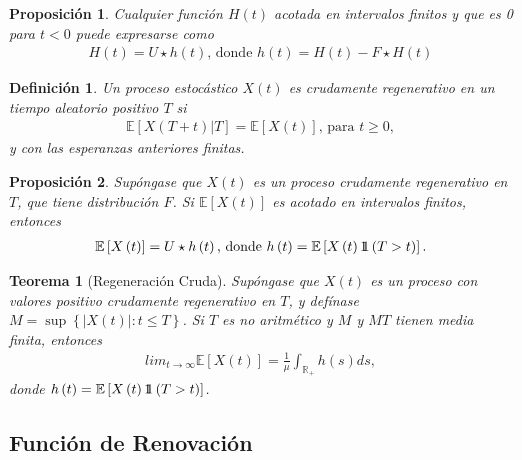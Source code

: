 \documentclass{article}
\newtheorem{Def}{Definición}
\newtheorem{Teo}{Teorema}
\newtheorem{Prop}{Proposición}
\newcommand{\rea}{\mathbb{R}}
\newcommand{\esp}{\mathbb{E}}
\newcommand{\indora}{\mbox{$1$\hspace{-0.8ex}$1$}}
\begin{document}
\begin{Prop}
Cualquier funci\'on $H\left(t\right)$ acotada en intervalos finitos y que es 0 para $t<0$ puede expresarse como
\begin{eqnarray*}
H\left(t\right)=U\star h\left(t\right)\textrm{,  donde }h\left(t\right)=H\left(t\right)-F\star H\left(t\right)
\end{eqnarray*}
\end{Prop}

\begin{Def}
Un proceso estoc\'astico $X\left(t\right)$ es crudamente regenerativo en un tiempo aleatorio positivo $T$ si
\begin{eqnarray*}
\esp\left[X\left(T+t\right)|T\right]=\esp\left[X\left(t\right)\right]\textrm{, para }t\geq0,\end{eqnarray*}
y con las esperanzas anteriores finitas.
\end{Def}

\begin{Prop}
Sup\'ongase que $X\left(t\right)$ es un proceso crudamente regenerativo en $T$, que tiene distribuci\'on $F$. Si $\esp\left[X\left(t\right)\right]$ es acotado en intervalos finitos, entonces
\begin{eqnarray*}
\esp\left[X\left(t\right)\right]=U\star h\left(t\right)\textrm{,  donde }h\left(t\right)=\esp\left[X\left(t\right)\indora\left(T>t\right)\right].
\end{eqnarray*}
\end{Prop}

\begin{Teo}[Regeneraci\'on Cruda]
Sup\'ongase que $X\left(t\right)$ es un proceso con valores positivo crudamente regenerativo en $T$, y def\'inase $M=\sup\left\{|X\left(t\right)|:t\leq T\right\}$. Si $T$ es no aritm\'etico y $M$ y $MT$ tienen media finita, entonces
\begin{eqnarray*}
lim_{t\rightarrow\infty}\esp\left[X\left(t\right)\right]=\frac{1}{\mu}\int_{\rea_{+}}h\left(s\right)ds,
\end{eqnarray*}
donde $h\left(t\right)=\esp\left[X\left(t\right)\indora\left(T>t\right)\right]$.
\end{Teo}



%
\subsection{Funci\'on de Renovaci\'on}
%
\end{document}

